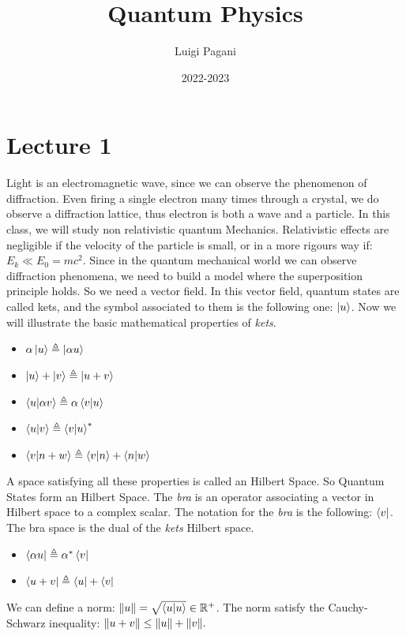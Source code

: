 \documentclass{article}
\title{Quantum Physics}
\author{Luigi Pagani }
\date{2022-2023}
\begin{document}
\maketitle

\section{Lecture 1}

Light is an electromagnetic wave, since we can observe the phenomenon of diffraction.
Even firing a single electron many times through a crystal, we do observe a diffraction lattice, thus electron is both a wave and a particle.
In this class, we will study non relativistic quantum Mechanics. Relativistic effects are negligible if the velocity of the particle is small, or in a more rigours way if: $E_k \ll E_0 = mc^2.$
Since in the quantum mechanical world we can observe diffraction phenomena, we need to build a model where the superposition principle holds. So we need a vector field. In this vector field, quantum states are called kets, and the symbol associated to them is the following one: $ \ket{u}$.
Now we will illustrate the basic mathematical properties of \emph{kets}.

\begin{itemize}

\item $\alpha \ket{u} \triangleq \ket{\alpha u}$

\item $ \ket{u} + \ket{v} \triangleq \ket{u+v}$

\item $ \bra{u} \ket{\alpha v} \triangleq \alpha \bra{v} \ket{u} $

\item $ \bra{u}\ket{v} \triangleq \bra{v}\ket{u}^*$

\item $\bra{v}\ket{n+w} \triangleq \bra{v}\ket{n} + \bra{n}\ket{w}$ 

\end{itemize}
A space satisfying all these properties is called an Hilbert Space. So Quantum States form an Hilbert Space.
The \emph{bra} is an operator associating a vector in Hilbert space to a complex scalar. The notation for the \emph{bra} is the following: $\bra{v}$. The bra space is the dual of the \emph{kets} Hilbert space.
\begin{itemize}

\item  $\bra{\alpha u} \triangleq \alpha^* \bra{v}  $ 

\item $ \bra{u+v} \triangleq \bra{u} + \bra{v}$

\end{itemize}
We can define a norm: $\norm{u} = \sqrt{\bra{u}\ket{u}}\in \mathbb{R^+}$.
The norm satisfy the Cauchy-Schwarz inequality: $\norm{u+v} \leq \norm{u} + \norm{v}. $
\end{document}
